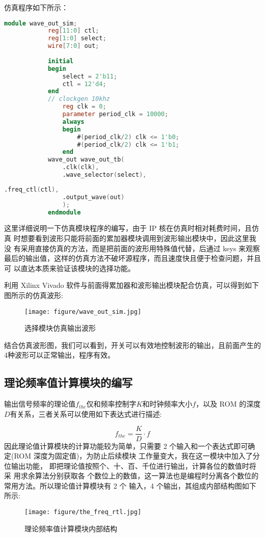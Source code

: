 {\begin{spacing}{1.5}
			仿真程序如下所示：
			\begin{lstlisting}[language=Verilog]
			module wave_out_sim;
			reg[11:0] ctl;
			reg[1:0] select;
			wire[7:0] out;
			
			initial
			begin
				select = 2'b11;
				ctl = 12'd4;
			end
			// clockgen 10khz
				reg clk = 0;
				parameter period_clk = 10000;
				always
				begin
					#(period_clk/2) clk <= 1'b0;
					#(period_clk/2) clk <= 1'b1;
				end
			wave_out wave_out_tb(
				.clk(clk),
				.wave_selector(select),
			\end{lstlisting}
			\begin{lstlisting}[language=Verilog]
				.freq_ctl(ctl),
				.output_wave(out)
				);
			endmodule
			\end{lstlisting}

			这里详细说明一下仿真模块程序的编写，由于 IP 核在仿真时相对耗费时间，且仿真 时想要看到波形只能将前面的累加器模块调用到波形输出模块中，因此这里我没 有采用直接仿真的方法，而是把前面的波形用特殊值代替，后通过 keys 来观察最后的输出值，这样的仿真方法不破坏源程序，而且速度快且便于检查问题，并且可 以直达本质来验证该模块的选择功能。

			利用 Xilinx Vivado 软件与前面得累加器和波形输出模块配合仿真，可以得到如下图所示的仿真波形:
			\newline
			\begin{figure}[htbp]
				\centering
				\texttt{[image: figure/wave\_out\_sim.jpg]}
				\caption{选择模块仿真输出波形}\label{fig:wave_out_sim}
			\end{figure}

			结合仿真波形图，我们可以看到，开关可以有效地控制波形的输出，且前面产生的 4种波形可以正常输出，程序有效。
		\subsection{理论频率值计算模块的编写}
			输出信号频率的理论值$f_{the}$仅和频率控制字$K$和时钟频率大小$f$，以及 ROM 的深度$D$有关系，三者关系可以使用如下表达式进行描述:

			\begin{equation}
				f_{the}=\frac{K}{D}\cdot f
			\end{equation}
			因此理论值计算模块的计算功能较为简单，只需要 2 个输入和一个表达式即可确定(ROM 深度为固定值)，为防止后续模块
			工作量变大，我在这一模块中加入了分位输出功能， 即把理论值按照个、十、百、千位进行输出，计算各位的数值时将采
			用求余算法分别获取各 个数位上的数值，这一算法也是编程时分离各个数位的常用方法。所以理论值计算模块有 2 个
			输入，4 个输出，其组成内部结构图如下所示:
			\newline
			\begin{figure}[htbp]
				\centering
				\texttt{[image: figure/the\_freq\_rtl.jpg]}
				\caption{理论频率值计算模块内部结构}\label{fig:the_freq_rtl}
			\end{figure}


\end{spacing}}
